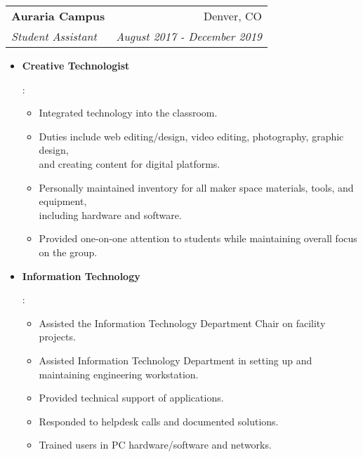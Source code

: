 \documentclass[letterpaper,11pt]{article}
\makeatletter
\newcommand{\resumeItem}[2]{
  \item\small{
    \textbf{#1}{: #2 \vspace{-2pt}}
  }
}
\newcommand{\resumeSubheading}[4]{
  \vspace{-1pt}\item
    \begin{tabular*}{0.97\textwidth}{l@{\extracolsep{\fill}}r}
      \textbf{#1} & #2 \\
      \textit{\small#3} & \textit{\small #4} \\
    \end{tabular*}\vspace{-5pt}
}
\newcommand{\resumeItemListStart}{\begin{itemize}}
\newcommand{\resumeItemListEnd}{\end{itemize}\vspace{-5pt}}
\makeatother
\begin{document}
    \resumeSubheading
      {Auraria Campus}{Denver, CO}
      {Student Assistant}{August 2017 - December 2019}
      \resumeItemListStart
        \resumeItem{Creative Technologist}
          {
          \begin{itemize}
              \item Integrated technology into the classroom.
              \item Duties include web editing/design, video editing, photography, graphic design,\\ and creating content for digital platforms.
              \item Personally maintained inventory for all maker space materials, tools, and equipment,\\ including hardware and software. 
              \item Provided one-on-one attention to students while maintaining overall focus on the group.
          \end{itemize}}
        \resumeItem{Information Technology}
          {\begin{itemize}
              \item Assisted the Information Technology Department Chair on facility projects.
              \item Assisted Information Technology Department in setting up and maintaining engineering workstation.
              \item Provided technical support of applications.
              \item Responded to helpdesk calls and documented solutions.
              \item Trained users in PC hardware/software and networks.
          \end{itemize}} 
      \resumeItemListEnd
\end{document}
